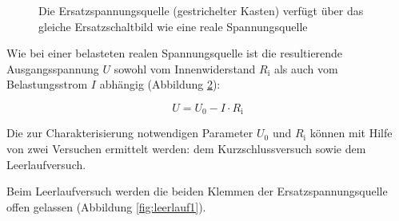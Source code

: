 \begin{frame}
{\begin{figure}[h!]
\begin{center}
\begin{tikzpicture}
			\end{tikzpicture}
		\end{center}
	\caption{Die Ersatzspannungsquelle (gestrichelter Kasten) verfügt über das gleiche Ersatzschaltbild wie eine reale Spannungsquelle}


	\label{fig:testiiiii}

	


		
	\end{figure}

	

	






	Wie bei einer belasteten realen Spannungsquelle ist die resultierende Ausgangsspannung $U$
	 sowohl vom Innenwiderstand $R_\mathrm{i}$ als auch vom Belastungsstrom $I$ abhängig (Abbildung \ref{fig:kennliniespannung}):

	 \begin{equation*}
		U = U_0 - I \cdot R_\mathrm{i}
	 \end{equation*}

	 \begin{figure}[h!]
		\centering
		\s{}
		
		\label{fig:kennliniespannung}
	\end{figure}


	 

	 Die zur Charakterisierung notwendigen Parameter $U_0$ und $R_\mathrm{i}$ können mit Hilfe von zwei
	Versuchen ermittelt werden: dem Kurzschlussversuch sowie dem Leerlaufversuch.

	Beim Leerlaufversuch werden die beiden Klemmen der Ersatzspannungsquelle offen gelassen (Abbildung \ref{fig:leerlauf1}). 

	\begin{figure}[h!]
		\begin{center}


\end{center}
\end{figure}}
\end{frame}
